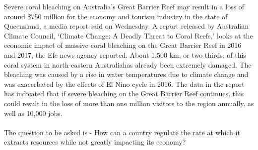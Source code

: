 \documentclass[10pt]{article}
\begin{document}
Severe coral bleaching on Australia’s Great Barrier Reef may result in a loss of around \$750 million for the economy and tourism industry in the state of Queensland, a media report said on Wednesday. A report released by Australian Climate Council, ‘Climate Change: A Deadly Threat to Coral Reefs,’ looks at the economic impact of massive coral bleaching on the Great Barrier Reef in 2016 and 2017, the Efe news agency reported. About 1,500 km, or two-thirds, of this coral system in north-eastern Australiahas already been extremely damaged. The bleaching was caused by a rise in water temperatures due to climate change and was exacerbated by the effects of El Nino cycle in 2016. The data in the report has indicated that if severe bleaching on the Great Barrier Reef continues, this could result in the loss of more than one million visitors to the region annually, as well as 10,000 jobs.
\\
\\
The question to be asked is - How can a country regulate the rate at which it extracts resources while not greatly impacting its economy?
\end{document}
